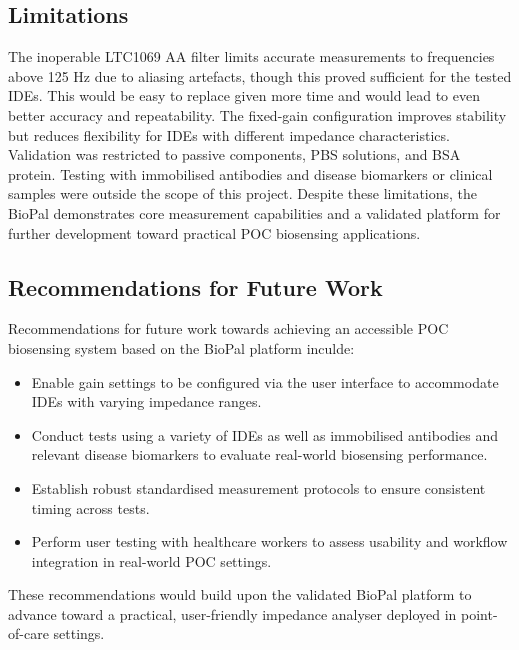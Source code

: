\subsection{Limitations}
The inoperable LTC1069 AA filter limits accurate measurements to frequencies above 125 Hz due to aliasing artefacts, though this proved sufficient for the tested IDEs. This would be easy to replace given more time and would lead to even better accuracy and repeatability. The fixed-gain configuration improves stability but reduces flexibility for \acp{IDE} with different impedance characteristics. Validation was restricted to passive components, PBS solutions, and BSA protein. Testing with immobilised antibodies and disease biomarkers or clinical samples were outside the scope of this project. Despite these limitations, the BioPal demonstrates core measurement capabilities and a validated platform for further development toward practical \ac{POC} biosensing applications.

\subsection{Recommendations for Future Work}
Recommendations for future work towards achieving an accessible \ac{POC} biosensing system based on the BioPal platform inculde:
\begin{itemize}
    \item Enable gain settings to be configured via the user interface to accommodate \acp{IDE} with varying impedance ranges.
    \item Conduct tests using a variety of \acp{IDE} as well as immobilised antibodies and relevant disease biomarkers to evaluate real-world biosensing performance.
    \item Establish robust standardised measurement protocols to ensure consistent timing across tests.
    \item Perform user testing with healthcare workers to assess usability and workflow integration in real-world \ac{POC} settings.
\end{itemize}

These recommendations would build upon the validated BioPal platform to advance toward a practical, user-friendly impedance analyser deployed in point-of-care settings.